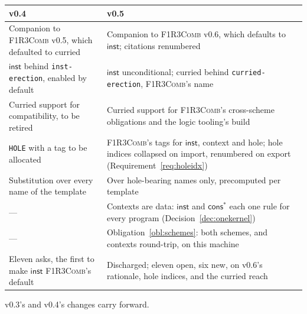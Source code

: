 \documentclass[11pt,a4paper]{article}
\newcommand{\code}[1]{\texttt{#1}}
\newcommand{\Comb}{\textsc{F1R3Comb}}
\theoremstyle{definition}
\theoremstyle{plain}
\newcommand{\inst}{\mathsf{inst}}
\newcommand{\cstar}{\mathsf{cons}^{*}}
\begin{document}
\begin{center}
\begin{tabularx}{\linewidth}{@{}l>{\raggedright\arraybackslash}X@{}}
\toprule
v0.4 & v0.5\\
\midrule
Companion to \Comb{} v0.5, which defaulted to curried & Companion to \Comb{}
v0.6, which defaults to $\inst$; citations renumbered\\
$\inst$ behind \code{inst-erection}, enabled by default & $\inst$
unconditional; curried behind \code{curried-erection}, \Comb's name\\
Curried support for compatibility, to be retired & Curried support for
\Comb's cross-scheme obligations and the logic tooling's build\\
\code{HOLE} with a tag to be allocated & \Comb's tags for $\inst$, context
and hole; hole indices collapsed on import, renumbered on export
(Requirement~\ref{req:holeidx})\\
Substitution over every name of the template & Over hole-bearing names only,
precomputed per template\\
--- & Contexts are data: $\inst$ and $\cstar$ each one rule for every program
(Decision~\ref{dec:onekernel})\\
--- & Obligation~\ref{obl:schemes}: both schemes, and contexts round-trip, on
this machine\\
Eleven asks, the first to make $\inst$ \Comb's default & Discharged; eleven
open, six new, on v0.6's rationale, hole indices, and the curried reach\\
\bottomrule
\end{tabularx}
\end{center}

\noindent
v0.3's and v0.4's changes carry forward.
\end{document}
